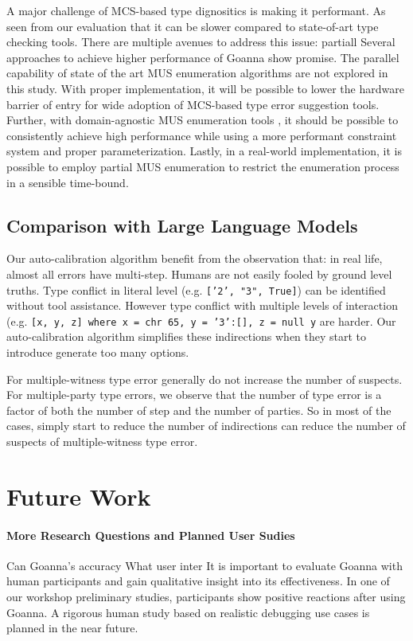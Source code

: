 \documentclass[pdflatex,sn-mathphys-num]{sn-jnl}%
\begin{document}
    A major challenge of MCS-based type dignositics is making it performant. As seen from our evaluation that it can be slower compared to state-of-art type checking tools. There are multiple avenues to address this issue: partiall
   Several approaches to achieve higher performance of Goanna show promise. The parallel capability of state of the art MUS enumeration \cite{Zhao2016-bu} algorithms are not explored in this study. With proper implementation, it will be possible to lower the hardware barrier of entry for wide adoption of MCS-based type error suggestion tools. Further, with domain-agnostic MUS enumeration tools \cite{Bendik2020-pz}, it should be possible to consistently achieve high performance while using a more performant constraint system and proper parameterization. Lastly, in a real-world implementation, it is possible to employ partial MUS enumeration \cite{Previti2013-mr,Liffiton2016-xi} to restrict the enumeration process in a sensible time-bound.

\subsection{Comparison with Large Language Models}
    
Our auto-calibration algorithm benefit from the observation that: in real life, almost all errors have multi-step. Humans are not easily fooled by ground level truths. Type conflict in literal level (e.g. \texttt{['2', "3", True]}) can be identified without tool assistance. However type conflict with multiple levels of interaction (e.g. \texttt{[x, y, z] where x = chr 65, y = '3':[], z = null y} are harder. Our auto-calibration algorithm simplifies these indirections when they start to introduce generate too many options. 

For multiple-witness type error generally do not increase the number of suspects. For multiple-party type errors, we observe that the number of type error is a factor of both the number of step and the number of parties. So in most of the cases, simply start to reduce the number of indirections can reduce the number of suspects of multiple-witness type error.


\section{Future Work}\label{sec:future-work}
\paragraph{\textbf{More Research Questions and Planned User Sudies}}
Can Goanna's accuracy
What user inter
It is important to evaluate Goanna with human participants and gain qualitative insight into its effectiveness. In one of our workshop preliminary studies, participants show positive reactions after using Goanna. A rigorous human study based on realistic debugging use cases is planned in the near future.   
  	
\end{document}
